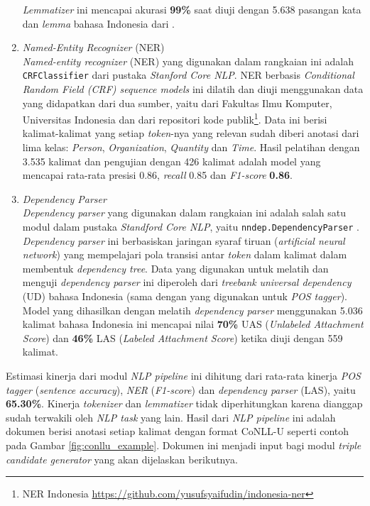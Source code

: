 \begin{enumerate}
\textit{Lemmatizer} ini mencapai akurasi \textbf{99\%} saat diuji dengan 5.638 pasangan kata dan \textit{lemma} bahasa Indonesia dari \cite{suhartono2014lemmatization}.

\item \textit{Named-Entity Recognizer} (NER) \\
\textit{Named-entity recognizer} (NER) yang digunakan dalam rangkaian ini adalah \verb|CRFClassifier| \citep{finkel2005incorporating} dari pustaka \textit{Stanford Core NLP}. NER berbasis \textit{Conditional Random Field (CRF) sequence models} ini dilatih dan diuji menggunakan data yang didapatkan dari dua sumber, yaitu dari Fakultas Ilmu Komputer, Universitas Indonesia dan dari repositori kode publik\footnote{NER Indonesia \url{https://github.com/yusufsyaifudin/indonesia-ner}}. Data ini berisi kalimat-kalimat yang setiap \textit{token}-nya yang relevan sudah diberi anotasi dari lima kelas: \textit{Person}, \textit{Organization}, \textit{Quantity} dan \textit{Time}. Hasil pelatihan dengan 3.535 kalimat dan pengujian dengan 426 kalimat adalah model yang mencapai rata-rata presisi 0.86, \textit{recall} 0.85 dan \textit{F1-score} \textbf{0.86}.

\item \textit{Dependency Parser} \\
\textit{Dependency parser} yang digunakan dalam rangkaian ini adalah salah satu modul dalam pustaka \textit{Standford Core NLP}, yaitu \verb|nndep.DependencyParser| \citep{chen2014fast}. \textit{Dependency parser} ini berbasiskan jaringan syaraf tiruan (\textit{artificial neural network}) yang mempelajari pola transisi antar \textit{token} dalam kalimat dalam membentuk \textit{dependency tree}. Data yang digunakan untuk melatih dan menguji \textit{dependency parser} ini diperoleh dari \textit{treebank} \textit{universal dependency} (UD) bahasa Indonesia (sama dengan yang digunakan untuk \textit{POS tagger}). Model yang dihasilkan dengan melatih \textit{dependency parser} menggunakan 5.036 kalimat bahasa Indonesia ini mencapai nilai \textbf{70\%} UAS (\textit{Unlabeled Attachment Score}) dan \textbf{46\%} LAS (\textit{Labeled Attachment Score}) ketika diuji dengan 559 kalimat.

\end{enumerate}

Estimasi kinerja dari modul \textit{NLP pipeline} ini dihitung dari rata-rata kinerja \textit{POS tagger} (\textit{sentence accuracy}), \textit{NER} (\textit{F1-score}) dan \textit{dependency parser} (LAS), yaitu \textbf{65.30\%}. Kinerja \textit{tokenizer} dan \textit{lemmatizer} tidak diperhitungkan karena dianggap sudah terwakili oleh \textit{NLP task} yang lain. Hasil dari \textit{NLP pipeline} ini adalah dokumen berisi anotasi setiap kalimat dengan format CoNLL-U seperti contoh pada Gambar \ref{fig:conllu_example}. Dokumen ini menjadi input bagi modul \textit{triple candidate generator} yang akan dijelaskan berikutnya. 

